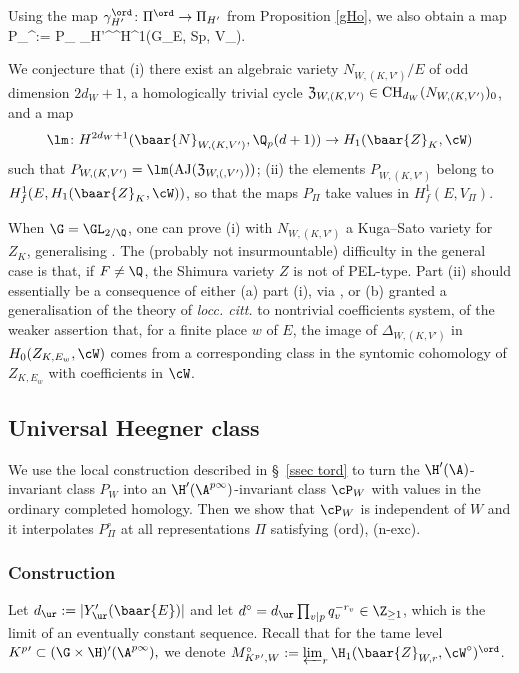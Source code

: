 Using  the map $\gamma_{H'}^{\ord}\colon \Pi^{\ord}\to \Pi_{H'} $ from Proposition \ref{gHo}, we also obtain a  map
\beq{}
P_{\Pi}^{\ord}:=   P_{\Pi} \gamma_{H'}^{\ord}\colon \Pi^{\ord}\to H^{1}(G_{E, Sp}, V_{\Pi}).\eeq


\begin{rema}
\notready{}  We conjecture that (i) there exist an algebraic variety $N_{W,(K, V')}/E$ of odd dimension $2d_{W}+1$, a homologically trivial cycle $\mathfrak{Z}_{W, (K, V')}\in {\rm CH}_{d_{W}}(N_{W, (K, V')})_{0}$, and a map $$\lm\colon H^{2d_{W}+1}(\baar{N}_{W, (K, V')}, \Q_{p}(d+1)) \to H_{1}(\baar{Z}_{K}, \cW)$$ such that $P_{W, (K, V')} =\lm({\rm AJ}(\mathfrak{Z}_{W, (, V')}))$; (ii) the elements $P_{W, (K, V')}$  belong to  $ H^{1}_{f}(E, H_{1}(\baar{Z}_{K}, \cW))$, so that the maps $P_{\Pi}$ take values in $H^{1}_{f}(E, V_{\Pi})$.

When $\G=\GL_{2/\Q}$, one can prove (i) with $N_{W, (K, V')}$ a Kuga--Sato variety for $Z_{K}$,  generalising \cite[Proposition II.2.4]{nek-heeg}.
The (probably not insurmountable) difficulty  in the general case is that, if $F\neq \Q$, the Shimura variety $Z $ is not of PEL-type.  Part (ii) should essentially be a consequence of either  (a)  part (i),  via \cite{nek-syn,nek-niz}, or (b) granted a generalisation of the theory of \emph{locc. citt.}  to nontrivial coefficients system,  of the  weaker assertion that, for a finite place $w$ of $E$, the image of $\Delta_{W, (K, V')}$ in $H_{0}({Z}_{K, E_{w}},\cW)$  comes from a corresponding  class in  the syntomic cohomology of $Z_{K, E_{w}}$ with coefficients in $\cW$.
\end{rema}

\subsection{Universal Heegner class} 
We use the local construction described in  \S~\ref{ssec tord} to turn the $\H'(\A)$-invariant class $P_{W}$ into  an $\H'(\A^{p\infty})$-invariant  class $\cP_{W}$ with values in the ordinary completed homology.
Then we show that $\cP_{W}$ is independent of $W$ and it interpolates $P^{\circ}_{\Pi}$ at all representations $\Pi$ satisfying (ord), (n-exc).
\subsubsection{Construction}
Let $d_{\ur}:=|Y'_{\ur}(\baar{E})|$ and let
$ d^{\circ} =  d_{\ur}\prod_{v\vert p}q_{v}^{-r_{v}} \in \Z_{\geq 1}$, which is the limit of an eventually constant sequence.
Recall that for  the tame level $K^{p}{}'\subset( \G\times \H)'(\A^{p\infty}), $
 we denote  $M^{\circ}_{K^{p}{}', W}:=  \varprojlim_{r}\H_{1} (\baar{Z}_{W,r}, \cW^{\circ})^{\ord}$.

